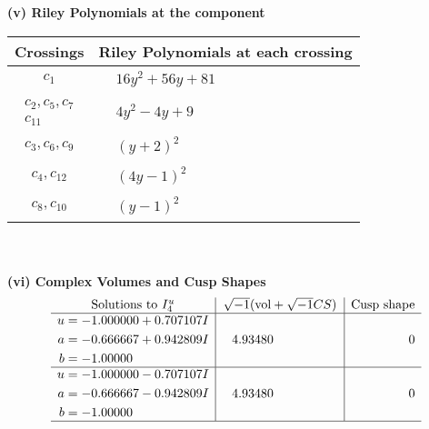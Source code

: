 \documentclass[1p]{elsarticle_modified}
\theoremstyle{definition}
\newcommand{\I}{\sqrt{-1}}
\begin{document}
\newpage\renewcommand{\arraystretch}{1}
\flushleft \textbf{(v) Riley Polynomials at the component}\newline \\
\begin{tabular}{m{50pt}|m{274pt}}
Crossings & \hspace{64pt}Riley Polynomials at each crossing \\
\hline $$\begin{aligned}c_{1}\end{aligned}$$&$\begin{aligned}
&16 y^2+56 y+81
\end{aligned}$\\
\hline $$\begin{aligned}c_{2},c_{5},c_{7}\\c_{11}\end{aligned}$$&$\begin{aligned}
&4 y^2-4 y+9
\end{aligned}$\\
\hline $$\begin{aligned}c_{3},c_{6},c_{9}\end{aligned}$$&$\begin{aligned}
&(y+2)^2
\end{aligned}$\\
\hline $$\begin{aligned}c_{4},c_{12}\end{aligned}$$&$\begin{aligned}
&(4 y-1)^2
\end{aligned}$\\
\hline $$\begin{aligned}c_{8},c_{10}\end{aligned}$$&$\begin{aligned}
&(y-1)^2
\end{aligned}$\\
\hline
\end{tabular}\\~\\
\newpage\flushleft \textbf{(vi) Complex Volumes and Cusp Shapes}
$$\begin{array}{c|c|c}  
\text{Solutions to }I^u_{4}& \I (\text{vol} + \sqrt{-1}CS) & \text{Cusp shape}\\
 \hline 
\begin{aligned}
u &= -1.000000 + 0.707107 I \\
a &= -0.666667 + 0.942809 I \\
b &= -1.00000\phantom{ +0.000000I}\end{aligned}
 & \phantom{-}4.93480\phantom{ +0.000000I} & \phantom{-0.000000 } 0 \\ \hline\begin{aligned}
u &= -1.000000 - 0.707107 I \\
a &= -0.666667 - 0.942809 I \\
b &= -1.00000\phantom{ +0.000000I}\end{aligned}
 & \phantom{-}4.93480\phantom{ +0.000000I} & \phantom{-0.000000 } 0\\
 \hline 
 \end{array}$$\newpage\newpage\renewcommand{\arraystretch}{1}
\end{document}
